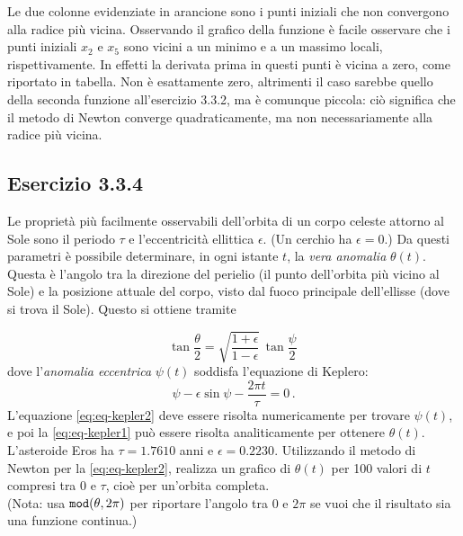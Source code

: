 \documentclass[letterpaper, 12pt]{article}
\begin{document}
Le due colonne evidenziate in arancione sono i punti iniziali che non convergono alla radice più vicina. 
Osservando il grafico della funzione è facile osservare che i punti iniziali $x_2$ e $x_5$ sono vicini a
un minimo e a un massimo locali, rispettivamente. In effetti la derivata prima in questi punti è vicina a zero,
come riportato in tabella. Non è esattamente zero, altrimenti il caso sarebbe quello della seconda funzione 
all'esercizio 3.3.2, ma è comunque piccola: ciò significa che il metodo di Newton converge quadraticamente, ma
non necessariamente alla radice più vicina. \\

\subsection{Esercizio 3.3.4}
Le proprietà più facilmente osservabili dell'orbita di un corpo celeste attorno al Sole sono il periodo $\tau$ 
e l'eccentricità ellittica $\epsilon$. (Un cerchio ha $\epsilon=0$.) Da questi parametri è possibile determinare, 
in ogni istante $t$, la \textit{vera anomalia} $\theta(t)$. Questa è l'angolo tra la direzione del perielio 
(il punto dell'orbita più vicino al Sole) e la posizione attuale del corpo, visto dal fuoco principale 
dell'ellisse (dove si trova il Sole). Questo si ottiene tramite

\begin{equation}
    \label{eq:eq-kepler1}
    \tan \frac{\theta}{2} = \sqrt{\frac{1+\epsilon}{1-\epsilon}}\,
    \tan \frac{\psi}{2}\,
\end{equation}
dove l'\textit{anomalia eccentrica} $\psi(t)$ soddisfa l'equazione di Keplero:
\begin{equation}
    \label{eq:eq-kepler2}
    \psi - \epsilon \sin \psi - \frac{2\pi t}{\tau} = 0\,.
\end{equation}
L'equazione \ref{eq:eq-kepler2} deve essere risolta numericamente per trovare $\psi(t)$, 
e poi la \ref{eq:eq-kepler1} può essere risolta analiticamente per ottenere $\theta(t)$.
L'asteroide Eros ha $\tau=1.7610$ anni e $\epsilon=0.2230$. Utilizzando il metodo di Newton per la \ref{eq:eq-kepler2}, 
realizza un grafico di $\theta(t)$ per 100 valori di $t$ compresi tra $0$ e $\tau$, cioè per un'orbita completa.\\
(Nota: usa $\verb|mod|(\theta,2\pi)$ per riportare l'angolo tra 0 e $2\pi$ se vuoi che il risultato 
sia una funzione continua.)
\end{document}
